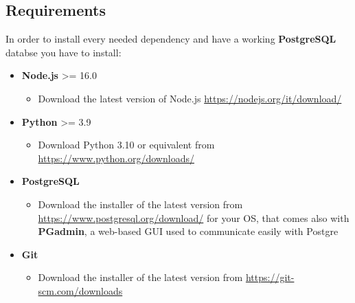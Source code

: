 \documentclass[table, 12pt]{article}
\begin{document}
\subsection{Requirements}
In order to install every needed dependency and have a working \textbf{PostgreSQL} databse you have to install:
\begin{itemize}
    \item \textbf{Node.js} >= 16.0
    \begin{itemize}
        \item Download the latest version of Node.js \url{https://nodejs.org/it/download/}
    \end{itemize}

    \item \textbf{Python} >= 3.9
    \begin{itemize}
        \item Download Python 3.10 or equivalent from \url{https://www.python.org/downloads/}
    \end{itemize}

    \item \textbf{PostgreSQL}
    \begin{itemize}
        \item Download the installer of the latest version from \url{https://www.postgresql.org/download/} for your OS, that comes also with \textbf{PGadmin}, 
        a web-based GUI used to communicate easily with Postgre
    \end{itemize}

    \item \textbf{Git}
    \begin{itemize}
        \item Download the installer of the latest version from \url{https://git-scm.com/downloads}
    \end{itemize}

\end{itemize}
\end{document}
